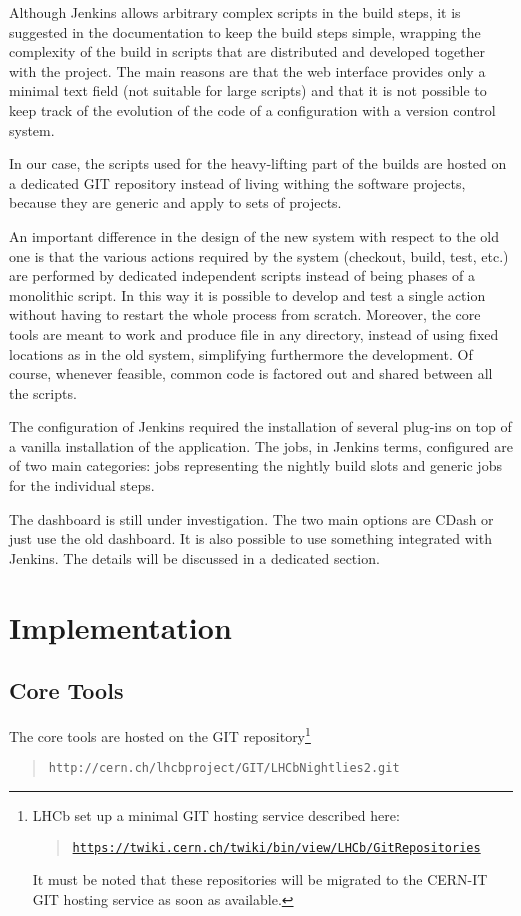 \documentclass{lhcbnote}
\newcommand{\link}[2]{\href{#1}{#2}}
\newcommand{\urlLink}[1]{\link{#1}{\texttt{#1}}}
\begin{document}
Although Jenkins allows arbitrary complex scripts in the build steps, it is
suggested in the documentation to keep the build steps simple, wrapping the
complexity of the build in scripts that are distributed and developed together
with the project.  The main reasons are that the web interface provides only a
minimal text field (not suitable for large scripts) and that it is not possible
to keep track of the evolution of the code of a configuration with a version
control system.

In our case, the scripts used for the heavy-lifting part of the builds are
hosted on a dedicated GIT\cite{GIT} repository instead of living withing the
software projects, because they are generic and apply to sets of projects.

An important difference in the design of the new system with respect to the old
one is that the various actions required by the system (checkout, build, test,
etc.) are performed by dedicated independent scripts instead of being phases of
a monolithic script.  In this way it is possible to develop and test a single
action without having to restart the whole process from scratch.  Moreover, the
core tools are meant to work and produce file in any directory, instead of using
fixed locations as in the old system, simplifying furthermore the development.
Of course, whenever feasible, common code is factored out and shared between all
the scripts.

The configuration of Jenkins required the installation of several plug-ins on
top of a vanilla installation of the application.  The jobs, in Jenkins terms,
configured are of two main categories: jobs representing the nightly build slots
and generic jobs for the individual steps.

The dashboard is still under investigation.  The two main options are
CDash\cite{CDash} or just use the old dashboard.  It is also possible to use
something integrated with Jenkins.  The details will be discussed in a dedicated
section.

\section{Implementation}
\subsection{Core Tools}
The core tools are hosted on the GIT repository\footnote{%
  LHCb set up a minimal GIT hosting service described here:
  \begin{quote}
    \urlLink{https://twiki.cern.ch/twiki/bin/view/LHCb/GitRepositories}
  \end{quote}
  It must be noted that these repositories will be migrated to the CERN-IT GIT
  hosting service as soon as available.}
\begin{quote}
  \texttt{http://cern.ch/lhcbproject/GIT/LHCbNightlies2.git}
\end{quote}
\end{document}
